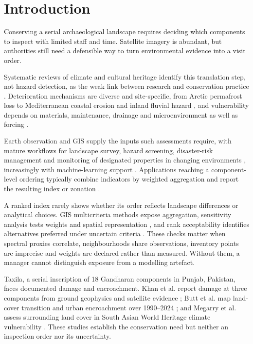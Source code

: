 \section{Introduction}
Conserving a serial archaeological landscape requires deciding which components to inspect with limited staff and time. Satellite imagery is abundant, but authorities still need a defensible way to turn environmental evidence into a visit order.

Systematic reviews of climate and cultural heritage identify this translation
step, not hazard detection, as the weak link between research and conservation
practice \citep{fatoric2017threatened,orr2021climate}. Deterioration mechanisms
are diverse and site-specific, from Arctic permafrost loss
\citep{hollesen2018arctic} to Mediterranean coastal erosion
\citep{reimann2018mediterranean} and inland fluvial hazard
\citep{liu2019angkor,arrighi2023flood}, and vulnerability depends on materials,
maintenance, drainage and microenvironment as well as forcing
\citep{sesana2021climate,sesana2020vulnerability,crowley2022risk}.

Earth observation and GIS supply the inputs such assessments require, with mature
workflows for landscape survey, hazard screening, disaster-risk management and
monitoring of designated properties in changing environments
\citep{lasaponara2011satellite,opitz2018trends,tapete2018geosciences,agapiou2020eo,luo2023space,guzman2020monitoring,agapiou2021dynamic,hadjimitsis2013cyprus},
increasingly with machine-learning support
\citep{argyrou2022review,yao2023overview,xiao2018geoinformatics}. Applications
reaching a component-level ordering typically combine indicators by weighted
aggregation and report the resulting index or zonation
\citep{yang2023yongtai,guerriero2022derwent,romao2022risk}.

A ranked index rarely shows whether its order reflects landscape differences or analytical choices. GIS multicriteria methods expose aggregation, sensitivity analysis tests weights and spatial representation \citep{malczewski2006gis,feizizadeh2014uncertainty,helton2006sensitivity}, and rank acceptability identifies alternatives preferred under uncertain criteria \citep{lahdelma2001smaa}. These checks matter when spectral proxies correlate, neighbourhoods share observations, inventory points are imprecise and weights are declared rather than measured. Without them, a manager cannot distinguish exposure from a modelling artefact.

Taxila, a serial inscription of 18 Gandharan components in Punjab, Pakistan, faces documented damage and encroachment. Khan et al. report damage at three components from ground geophysics and satellite evidence \citep{khan2022taxila}; Butt et al. map land-cover transition and urban encroachment over 1990--2024 \citep{butt2025taxila}; and Megarry et al. assess surrounding land cover in South Asian World Heritage climate vulnerability \citep{megarry2026landcover}. These studies establish the conservation need but neither an inspection order nor its uncertainty.

